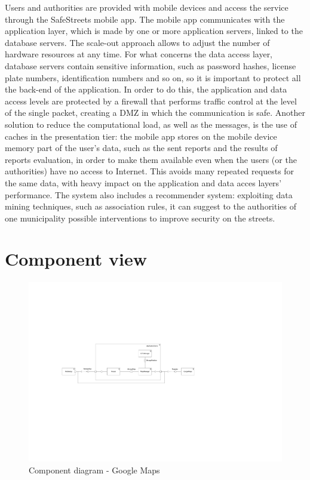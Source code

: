 \documentclass[12pt,a4paper]{report}
\begin{document}
	Users and authorities are provided with mobile devices and access the service through
	the SafeStreets mobile app. The mobile app communicates with the application layer, which
	is made by one or more application servers, linked to the database servers. The scale-out approach allows to adjust the number of hardware resources at any time. For what concerns the data access layer, database servers contain sensitive information, such as password hashes, license plate numbers, identification numbers and so on, so it is important to protect all the back-end of the application. In order to do this, the application and data access levels are protected by a firewall that performs traffic control at the level of the single packet, creating a DMZ in which the communication is safe. Another solution to reduce the computational load, as well as the messages, is the use of caches in the presentation tier: the mobile app stores on the mobile device memory part of the user's data, such as the sent reports and the results of reports evaluation, in order to make them available even when the users (or the authorities) have no access to Internet. This avoids many repeated requests for the same data, with heavy impact on the application and data acces layers' performance.
The system also includes a recommender system: exploiting data mining techniques, such as association rules, it can suggest to the authorities of one municipality possible interventions to improve security on the streets.

		\section{Component view}

	\begin{figure}[H]
				\includegraphics[scale = 0.4, center]{ComponentDiagramMaps}
				\caption{Component diagram - Google Maps}
	\end{figure}
\end{document}
